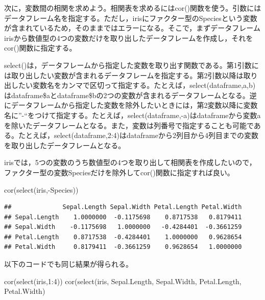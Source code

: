 \documentclass[
]{book}
\newenvironment{Shaded}{\begin{snugshade}}{\end{snugshade}}
\newcommand{\DecValTok}[1]{\textcolor[rgb]{0.00,0.00,0.81}{#1}}
\newcommand{\FunctionTok}[1]{\textcolor[rgb]{0.00,0.00,0.00}{#1}}
\newcommand{\NormalTok}[1]{#1}
\newcommand{\SpecialCharTok}[1]{\textcolor[rgb]{0.00,0.00,0.00}{#1}}
\begin{document}
次に，変数間の相関を求めよう。相関表を求めるにはcor()関数を使う。引数にはデータフレーム名を指定する。ただし，irisにファクター型のSpeciesという変数が含まれているため，そのままではエラーになる。そこで，まずデータフレームirisから数値型の4つの変数だけを取り出したデータフレームを作成し，それをcor()関数に指定する。

select()は，データフレームから指定した変数を取り出す関数である。第1引数には取り出したい変数が含まれるデータフレームを指定する。第2引数以降は取り出したい変数名をカンマで区切って指定する。たとえば，select(dataframe,a,b)はdataframe\$aとdataframe\$bの2つの変数が含まれるデータフレームとなる。逆にデータフレームから指定した変数を除外したいときには，第2変数以降に変数名に''-``をつけて指定する。たとえば，select(dataframe,-a)はdataframeから変数aを除いたデータフレームとなる。また，変数は列番号で指定することも可能である。たとえば，select(dataframe,2:4)はdataframeから2列目から4列目までの変数を取り出したデータフレームとなる。

irisでは，5つの変数のうち数値型の4つを取り出して相関表を作成したいので，ファクター型の変数Speciesだけを除外してcor()関数に指定すれば良い。

\begin{Shaded}
\begin{Highlighting}[]
\FunctionTok{cor}\NormalTok{(}\FunctionTok{select}\NormalTok{(iris,}\SpecialCharTok{{-}}\NormalTok{Species))}
\end{Highlighting}
\end{Shaded}

\begin{verbatim}
##              Sepal.Length Sepal.Width Petal.Length Petal.Width
## Sepal.Length    1.0000000  -0.1175698    0.8717538   0.8179411
## Sepal.Width    -0.1175698   1.0000000   -0.4284401  -0.3661259
## Petal.Length    0.8717538  -0.4284401    1.0000000   0.9628654
## Petal.Width     0.8179411  -0.3661259    0.9628654   1.0000000
\end{verbatim}

以下のコードでも同じ結果が得られる。

\begin{Shaded}
\begin{Highlighting}[]
\FunctionTok{cor}\NormalTok{(}\FunctionTok{select}\NormalTok{(iris,}\DecValTok{1}\SpecialCharTok{:}\DecValTok{4}\NormalTok{))}
\FunctionTok{cor}\NormalTok{(}\FunctionTok{select}\NormalTok{(iris, Sepal.Length, Sepal.Width, Petal.Length, Petal.Width)}
\end{Highlighting}
\end{Shaded}
\end{document}
